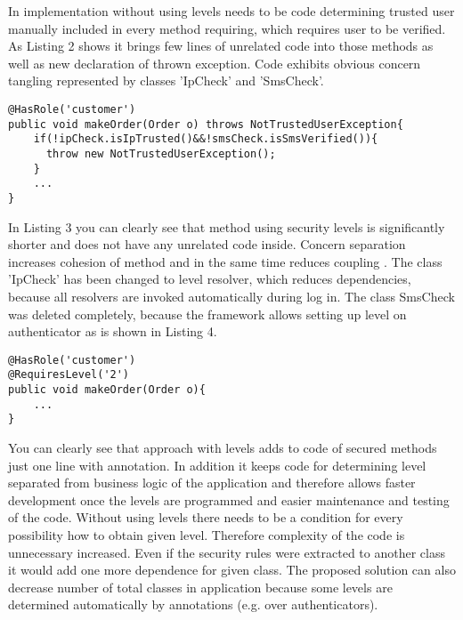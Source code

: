 \documentclass{sig-alternate}
\begin{document}
In implementation without using levels needs to be code determining trusted user manually included in every method requiring, which requires user to be verified. As Listing 2 shows it brings few lines of unrelated code into those methods as well as new declaration of thrown exception. Code exhibits obvious concern tangling \cite{concernSeparation} represented by classes 'IpCheck' and 'SmsCheck'.

\begin{lstlisting}[]
@HasRole('customer')
public void makeOrder(Order o) throws NotTrustedUserException{
    if(!ipCheck.isIpTrusted()&&!smsCheck.isSmsVerified()){
      throw new NotTrustedUserException();
    }
    ...
}          
\end{lstlisting}

In Listing 3 you can clearly see that method using security levels is significantly shorter and does not have any unrelated code inside. Concern separation \cite{concernSeparation} increases cohesion \cite{cohesionCoupling} of method and in the same time reduces coupling \cite{cohesionCoupling}. The class 'IpCheck' has been changed to level resolver, which reduces dependencies, because all resolvers are invoked automatically during log in. The class SmsCheck was deleted completely, because the framework allows setting up level on authenticator as is shown in Listing 4. 

\begin{lstlisting}[]
@HasRole('customer')
@RequiresLevel('2')
public void makeOrder(Order o){
    ...
}          
\end{lstlisting}

You can clearly see that approach with levels adds to code of secured methods just one line with annotation. In addition it keeps code for determining level separated from business logic of the application and therefore allows faster development once the levels are programmed and easier maintenance and testing of the code. Without using levels there needs to be a condition for every possibility how to obtain given level. Therefore complexity of the code is unnecessary increased. Even if the security rules were extracted to another class it would add one more dependence for given class. The proposed solution can also decrease number of total classes in application because some levels are determined automatically by annotations (e.g. over authenticators).
\end{document}
